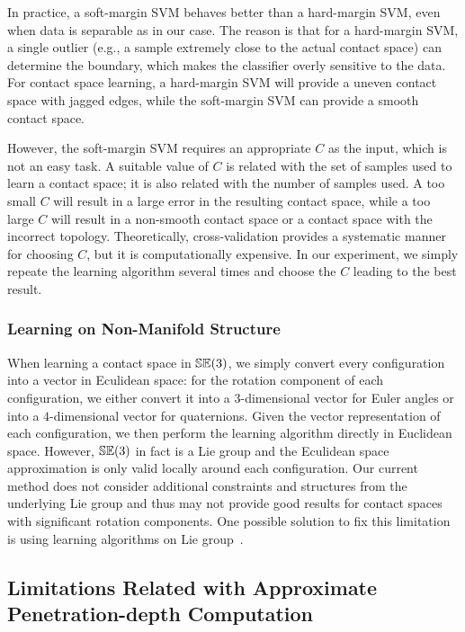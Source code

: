 In practice, a soft-margin SVM behaves better than a hard-margin SVM, even when data is separable as in our case. The reason is that for a hard-margin SVM, a single outlier (e.g., a sample extremely close to the actual contact space) can determine the boundary, which makes the classifier overly sensitive to the data. For contact space learning, a hard-margin SVM will provide a uneven contact space with jagged edges, while the soft-margin SVM can provide a smooth contact space. 

However, the soft-margin SVM requires an appropriate $C$ as the input, which is not an easy task. A suitable value of $C$ is related with the set of samples used to learn a contact space; it is also related with the number of samples used. A too small $C$ will result in a large error in the resulting contact space, while a too large $C$ will result in a non-smooth contact space or a contact space with the incorrect topology. Theoretically, cross-validation provides a systematic manner for choosing $C$, but it is computationally expensive. In our experiment, we simply repeate the learning algorithm several times and choose the $C$ leading to the best result.

\subsubsection{Learning on Non-Manifold Structure}
When learning a contact space in $\mathbb {SE}(3)$, we simply convert every configuration into a vector in Eculidean space: for the rotation component of each configuration, we either convert it into a $3$-dimensional vector for Euler angles or into a $4$-dimensional vector for quaternions. Given the vector representation of each configuration, we then perform the learning algorithm directly in Euclidean space. However, $\mathbb {SE}(3)$ in fact is a Lie group and the Eculidean space approximation is only valid locally around each configuration. Our current method does not consider additional constraints and structures from the underlying Lie group and thus may not provide good results for contact spaces with significant rotation components. One possible solution to fix this limitation is using learning algorithms on Lie group~\cite{Tuzel:2008:LLG}.

\subsection{Limitations Related with Approximate Penetration-depth Computation}

